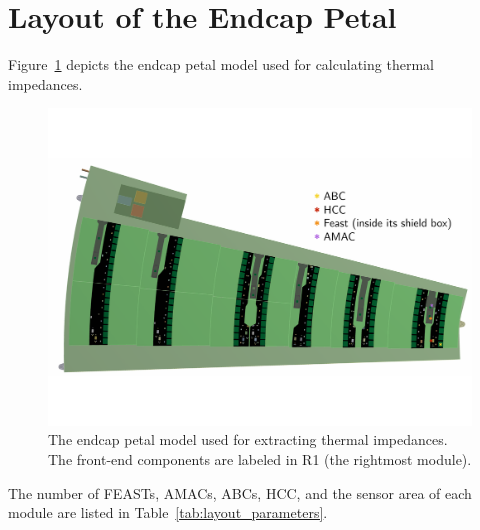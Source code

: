 
\section{Layout of the Endcap Petal}

Figure~\ref{endcap_model} depicts the endcap petal model used for calculating thermal impedances.

\begin{figure}[ht!]
\begin{center}
\includegraphics[width=0.99\linewidth]{figures/m30C_0Wm2C_Setup.pdf}
\end{center}
\caption{The endcap petal model used for extracting thermal impedances. The front-end components are
labeled in R1 (the rightmost module).}
\label{endcap_model}
\end{figure}

The number of FEASTs, AMACs, ABCs, HCC, and the sensor area of each module are listed in
Table~\ref{tab:layout_parameters}.
%
\let\arraystretcha\arraystretch
\renewcommand\arraystretch{1.1} %
\begin{table}[h]
\begin{center}
\end{center}
\caption{Number of components on each module.}
\label{tab:layout_parameters}
\end{table}
\let\arraystretch\arraystretcha

